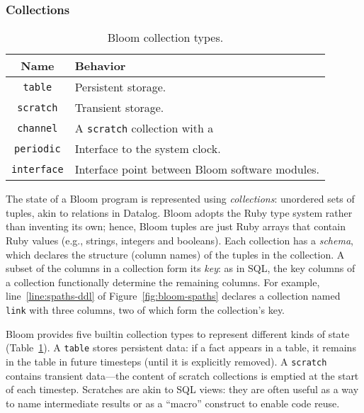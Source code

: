 \subsubsection{Collections}
\begin{table}[t]
\begin{tabular}{|c|l|}
\hline
\textbf{Name} & \textbf{Behavior }\\
\hline
\texttt{table} & Persistent storage.\\
\texttt{scratch} & Transient storage.\\
\texttt{channel} & A \texttt{scratch} collection with a \\
\texttt{periodic} & Interface to the system clock.\\
\texttt{interface} & Interface point between Bloom software modules.\\
\hline
\end{tabular}
\caption{Bloom collection types.}
\label{tbl:bloom-collections}
\end{table}

The state of a Bloom program is represented using \emph{collections}: unordered
sets of tuples, akin to relations in Datalog. Bloom adopts the Ruby type system
rather than inventing its own; hence, Bloom tuples are just Ruby arrays that
contain Ruby values (e.g., strings, integers and booleans). Each collection has
a \emph{schema}, which declares the structure (column names) of the tuples in
the collection. A subset of the columns in a collection form its \emph{key}: as
in SQL, the key columns of a collection functionally determine the remaining
columns. For example, line~\ref{line:spaths-ddl} of
Figure~\ref{fig:bloom-spaths} declares a collection named \texttt{link} with
three columns, two of which form the collection's key.

Bloom provides five builtin collection types to represent different kinds of
state (Table~\ref{tbl:bloom-collections}). A \texttt{table} stores persistent
data: if a fact appears in a table, it remains in the table in future timesteps
(until it is explicitly removed). A \texttt{scratch} contains transient
data---the content of scratch collections is emptied at the start of each
timestep. Scratches are akin to SQL views: they are often useful as a way to
name intermediate results or as a ``macro'' construct to enable code reuse.

